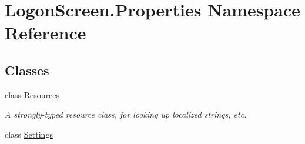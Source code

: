 \hypertarget{namespace_logon_screen_1_1_properties}{}\section{Logon\+Screen.\+Properties Namespace Reference}
\label{namespace_logon_screen_1_1_properties}
\subsection*{Classes}
\begin{DoxyCompactItemize}
\item 
class \mbox{\hyperlink{class_logon_screen_1_1_properties_1_1_resources}{Resources}}
\begin{DoxyCompactList}\small\item\em A strongly-\/typed resource class, for looking up localized strings, etc. \end{DoxyCompactList}\item 
class \mbox{\hyperlink{class_logon_screen_1_1_properties_1_1_settings}{Settings}}
\end{DoxyCompactItemize}
